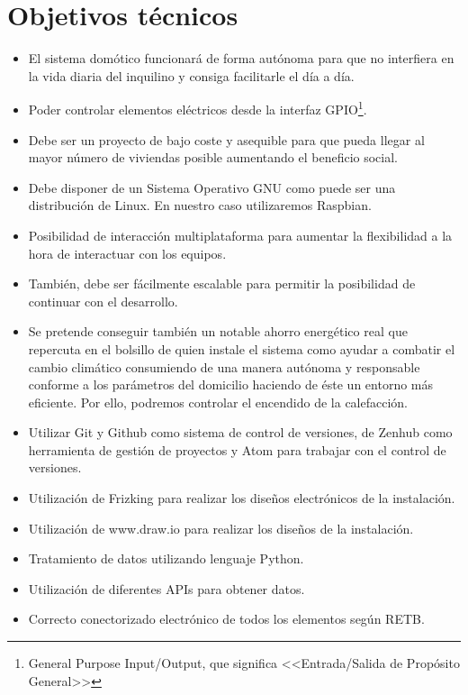 \section{Objetivos técnicos}
\begin{itemize}
    \item El sistema domótico funcionará de forma autónoma para que no interfiera en la vida diaria del inquilino y consiga facilitarle el día a día.
    \item Poder controlar elementos eléctricos desde la interfaz GPIO\footnote{General Purpose Input/Output, que significa <<Entrada/Salida de Propósito General>>}.
    \item Debe ser un proyecto de bajo coste y asequible para que pueda llegar al mayor número de viviendas posible aumentando el beneficio social.
    \item Debe disponer de un Sistema Operativo GNU como puede ser una distribución de Linux. En nuestro caso utilizaremos Raspbian.
    \item Posibilidad de interacción multiplataforma para aumentar la flexibilidad a la hora de interactuar con los equipos.
    \item También, debe ser fácilmente escalable para permitir la posibilidad de continuar con el desarrollo.
    \item Se pretende conseguir también un notable ahorro energético real que repercuta en el bolsillo de quien instale el sistema como ayudar a combatir el cambio climático consumiendo de una manera autónoma y responsable conforme a los parámetros del domicilio haciendo de éste un entorno más eficiente. Por ello, podremos controlar el encendido de la calefacción.
    \item Utilizar Git y Github como sistema de control de versiones, de Zenhub como herramienta de gestión de proyectos y Atom para trabajar con el control de versiones.
    \item Utilización de Frizking para realizar los diseños electrónicos de la instalación.
    \item Utilización de www.draw.io para realizar los diseños de la instalación.
    \item Tratamiento de datos utilizando lenguaje Python.
    \item Utilización de diferentes APIs para obtener datos.
    \item Correcto conectorizado electrónico de todos los elementos según RETB.
\end{itemize}


